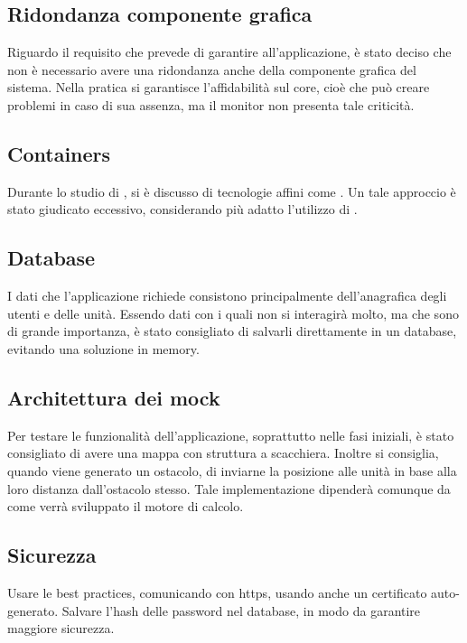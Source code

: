 \documentclass[]{article}
\begin{document}
		\subsection{Ridondanza componente grafica}
		Riguardo il requisito che prevede di garantire  all'applicazione, è stato deciso che non è necessario avere una ridondanza anche della componente grafica del sistema. Nella pratica si garantisce l'affidabilità sul core, cioè che può creare problemi in caso di sua assenza, ma il monitor non presenta tale criticità.

		\subsection{Containers}
		Durante lo studio di , si è discusso di tecnologie affini come . Un tale approccio è stato giudicato eccessivo, considerando più adatto l'utilizzo di .

		\subsection{Database}
		I dati che l'applicazione richiede consistono principalmente dell'anagrafica degli utenti e delle unità. Essendo dati con i quali non si interagirà molto, ma che sono di grande importanza, è stato consigliato di salvarli direttamente in un database, evitando una soluzione in memory.

		\subsection{Architettura dei mock}
		Per testare le funzionalità dell'applicazione, soprattutto nelle fasi iniziali, è stato consigliato di avere una mappa con struttura a scacchiera. Inoltre si consiglia, quando viene generato un ostacolo, di inviarne la posizione alle unità in base alla loro distanza dall'ostacolo stesso. Tale implementazione dipenderà comunque da come verrà sviluppato il motore di calcolo.

		\subsection{Sicurezza}
		Usare le best practices, comunicando con https, usando anche un certificato auto-generato. Salvare l'hash delle password nel database, in modo da garantire maggiore sicurezza.

	\newpage
\end{document}
